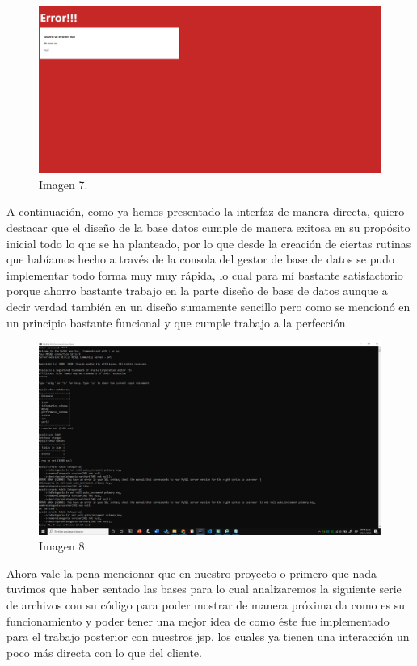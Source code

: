 \documentclass[10pt,a4paper]{article}
\begin{document}
\begin{figure}[h]
\centering
\includegraphics[width=13cm]{7}
\caption{Imagen 7.}
\label{fig:figure1}
\end{figure}

A continuación, como ya hemos presentado la interfaz de manera directa, quiero destacar que el diseño de la base datos cumple de manera exitosa en su propósito inicial todo lo que se ha planteado, por lo que desde la creación de ciertas rutinas que habíamos hecho a través de la consola del gestor de base de datos se pudo implementar todo forma muy muy rápida, lo cual para mí bastante satisfactorio porque ahorro bastante trabajo en la parte diseño de base de datos aunque a decir verdad también en un diseño sumamente sencillo pero como se mencionó en un principio bastante funcional y que cumple trabajo a la perfección.
\begin{figure}[h]
\centering
\includegraphics[width=13cm]{8}
\caption{Imagen 8.}
\label{fig:figure1}
\end{figure}

\vspace{60mm}

Ahora vale la pena mencionar que en nuestro proyecto o primero que nada tuvimos que haber sentado las bases para lo cual analizaremos la siguiente serie de archivos con su código para poder mostrar de manera próxima da como es su funcionamiento y poder tener una mejor idea de como éste fue implementado para el trabajo posterior con nuestros jsp, los cuales ya tienen una interacción un poco más directa con lo que del cliente.
\end{document}
